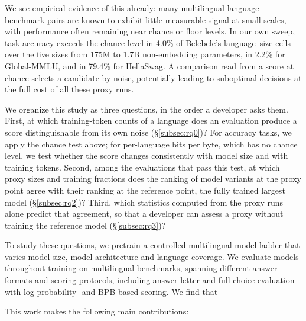 We see empirical evidence of this already: many multilingual language--benchmark pairs are known to exhibit little measurable signal at small scales, with performance often remaining near chance or floor levels.
In our own sweep, task accuracy exceeds the chance level in 4.0\% of Belebele's language--size cells over the five sizes from 175M to 1.7B non-embedding parameters, in 2.2\% for Global-MMLU, and in 79.4\% for HellaSwag. A comparison read from a score at chance selects a candidate by noise, potentially leading to suboptimal decisions at the full cost of all these proxy runs.

We organize this study as three questions, in the order a developer asks them.
First, at which training-token counts of a language does an evaluation produce a score distinguishable from its own noise (\S\ref{subsec:rq0})? For accuracy tasks, we apply the chance test above; for per-language bits per byte, which has no chance level, we test whether the score changes consistently with model size and with training tokens.
Second, among the evaluations that pass this test, at which proxy sizes and training fractions does the ranking of model variants at the proxy point agree with their ranking at the reference point, the fully trained largest model (\S\ref{subsec:rq2})?
Third, which statistics computed from the proxy runs alone predict that agreement, so that a developer can assess a proxy without training the reference model (\S\ref{subsec:rq3})?

To study these questions, we pretrain a controlled multilingual model ladder that varies model size, model architecture and language coverage.
We evaluate models throughout training on \nbenchmarks multilingual benchmarks, spanning different answer formats and scoring protocols, including answer-letter and full-choice evaluation with log-probability- and BPB-based scoring.
We find that  

This work makes the following main contributions:

